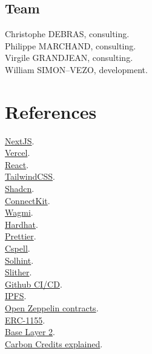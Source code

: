\documentclass[a4paper, 12pt]{article}
\begin{document}
\subsection{Team}

Christophe DEBRAS, consulting.\\

Philippe MARCHAND, consulting.\\

Virgile GRANDJEAN, consulting.\\

William SIMON--VEZO, development.

\appendix
\section{References}

\href{https://nextjs.org/}{NextJS}.\\

\href{https://vercel.com/varadiells-projects}{Vercel}.\\

\href{https://fr.react.dev/}{React}.\\

\href{https://tailwindcss.com/}{TailwindCSS}.\\

\href{https://ui.shadcn.com/}{Shadcn}.\\

\href{https://docs.family.co/connectkit}{ConnectKit}.\\

\href{https://wagmi.sh/}{Wagmi}.\\

\href{https://hardhat.org/}{Hardhat}.\\

\href{https://prettier.io/}{Prettier}.\\

\href{https://cspell.org/}{Cspell}.\\

\href{https://github.com/protofire/solhint}{Solhint}.\\

\href{https://github.com/crytic/slither}{Slither}.\\

\href{https://resources.github.com/devops/ci-cd/}{Github CI/CD}.\\

\href{https://ipfs.tech/}{IPFS}.\\

\href{https://github.com/OpenZeppelin/openzeppelin-contracts}{Open Zeppelin contracts}.\\

\href{https://ethereum.org/fr/developers/docs/standards/tokens/erc-1155/}{ERC-1155}.\\

\href{https://www.base.org/}{Base Layer 2}.\\

\href{https://www.climateimpact.com/services-projects/carbon-credits-explained-what-they-are-and-how-they-work/}{Carbon Credits explained}.\\
\end{document}
